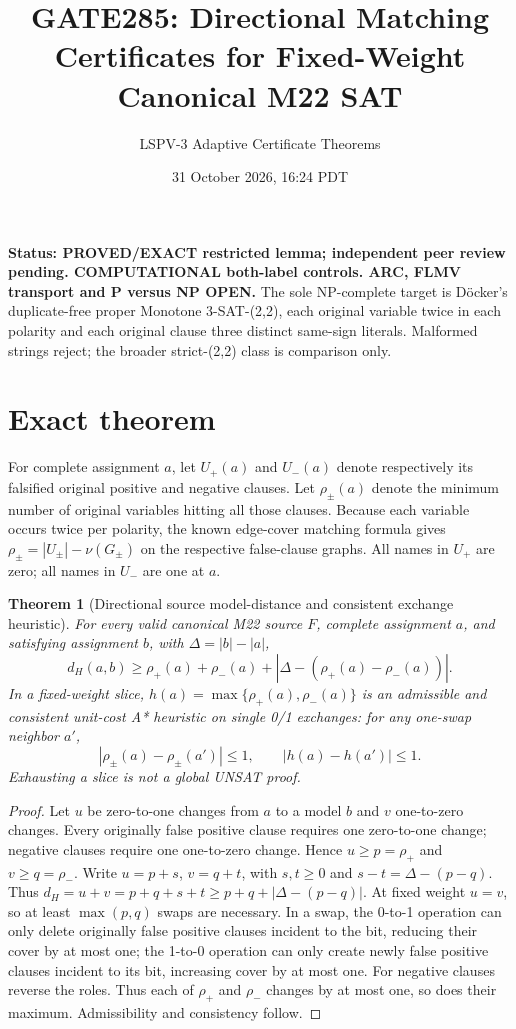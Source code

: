 \documentclass[11pt]{article}
\title{GATE285: Directional Matching Certificates for Fixed-Weight Canonical M22 SAT}
\author{LSPV-3 Adaptive Certificate Theorems}
\date{31 October 2026, 16:24 PDT}
\newtheorem{theorem}{Theorem}
\begin{document}
\maketitle
\noindent\textbf{Status: PROVED/EXACT restricted lemma; independent peer review pending. COMPUTATIONAL both-label controls. ARC, FLMV transport and P versus NP OPEN.}
The sole NP-complete target is D\"ocker's duplicate-free proper Monotone 3-SAT-(2,2), each original variable twice in each polarity and each original clause three distinct same-sign literals. Malformed strings reject; the broader strict-(2,2) class is comparison only.

\section{Exact theorem}
For complete assignment $a$, let $U_+(a)$ and $U_-(a)$ denote respectively its falsified original positive and negative clauses. Let $\rho_\pm(a)$ denote the minimum number of original variables hitting all those clauses. Because each variable occurs twice per polarity, the known edge-cover matching formula gives $\rho_\pm=|U_\pm|-\nu(G_\pm)$ on the respective false-clause graphs. All names in $U_+$ are zero; all names in $U_-$ are one at $a$.
\begin{theorem}[Directional source model-distance and consistent exchange heuristic]
For every valid canonical M22 source $F$, complete assignment $a$, and satisfying assignment $b$, with $\Delta=|b|-|a|$,
\[
d_H(a,b)\ge\rho_+(a)+\rho_-(a)+
\left|\Delta-\left(\rho_+(a)-\rho_-(a)\right)\right|.
\]
In a fixed-weight slice, $h(a)=\max\{\rho_+(a),\rho_-(a)\}$ is an admissible and consistent unit-cost A* heuristic on single 0/1 exchanges: for any one-swap neighbor $a'$,
\[
|\rho_\pm(a)-\rho_\pm(a')|\le1,\qquad |h(a)-h(a')|\le1.
\]
Exhausting a slice is not a global UNSAT proof.
\end{theorem}
\begin{proof}
Let $u$ be zero-to-one changes from $a$ to a model $b$ and $v$ one-to-zero changes. Every originally false positive clause requires one zero-to-one change; negative clauses require one one-to-zero change. Hence $u\ge p=\rho_+$ and $v\ge q=\rho_-$. Write $u=p+s$, $v=q+t$, with $s,t\ge0$ and $s-t=\Delta-(p-q)$. Thus $d_H=u+v=p+q+s+t\ge p+q+|\Delta-(p-q)|$. At fixed weight $u=v$, so at least $\max(p,q)$ swaps are necessary. In a swap, the 0-to-1 operation can only delete originally false positive clauses incident to the bit, reducing their cover by at most one; the 1-to-0 operation can only create newly false positive clauses incident to its bit, increasing cover by at most one. For negative clauses reverse the roles. Thus each of $\rho_+$ and $\rho_-$ changes by at most one, so does their maximum. Admissibility and consistency follow.
\end{proof}
\end{document}
